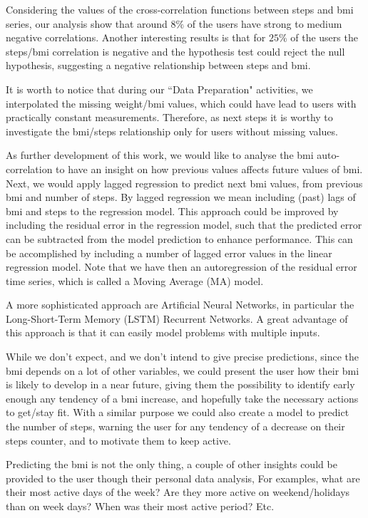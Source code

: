 \documentclass[11pt]{iopart}
\begin{document}
Considering the values of the cross-correlation functions between steps and bmi series, our analysis show that  around $8\%$ of the users
have strong to medium negative correlations. Another interesting results is that for $25\%$ of the users the steps/bmi correlation is negative and the hypothesis test could  reject the null hypothesis, suggesting a negative relationship between steps and bmi.

It is worth to notice  that during our ``Data Preparation" activities, we interpolated the missing weight/bmi values, which could have lead to users with practically constant measurements. Therefore, as next steps it is worthy to investigate the bmi/steps relationship only for users without missing  values.

As further development of this work, we would like to analyse the bmi auto-correlation to have an insight on how previous values affects future values of bmi. 
Next, we would apply lagged regression to predict next bmi values, from previous bmi and number of steps. By lagged regression we mean including 
(past) lags of bmi and steps to the regression model. This approach could be improved by including the residual error in the regression model, such that the
 predicted error can be subtracted from the model prediction to enhance performance.
This can be accomplished by including a number of lagged error values in the linear regression model.
Note that we have then an autoregression of the residual error time series, which is called a Moving Average (MA) model.
 
A more sophisticated approach are Artificial Neural Networks, in particular the Long-Short-Term Memory (LSTM) Recurrent Networks. A great advantage of this approach is that it can  easily  model problems with multiple inputs.

While we don't expect, and we don't intend to give precise predictions, since the bmi depends on a lot of other variables, we could present the user how their bmi is likely to develop in a near future, giving them the possibility to identify early enough any tendency of a bmi increase, and hopefully take the necessary actions to get/stay fit.
With a similar purpose we could also create a model to predict the number of steps, warning the user for any tendency of a decrease on their steps counter, and to motivate them to keep active.

Predicting the bmi is not the only thing, a couple of other insights could be provided to the user though their personal data analysis, For examples, what are their most active days of the week? Are they more active on weekend/holidays than on week days? When was their most active period? Etc. 
\end{document}
